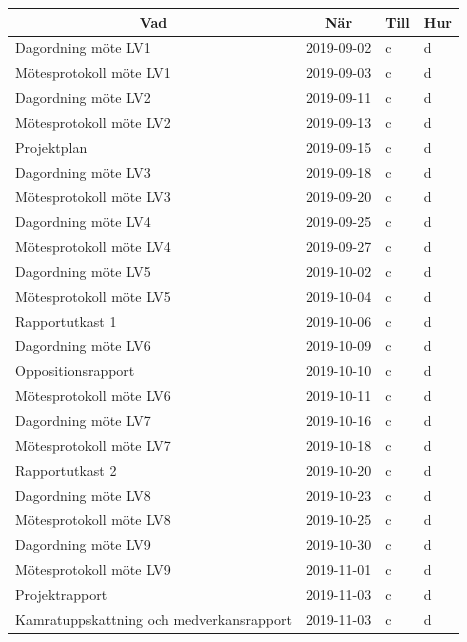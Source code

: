 \documentclass[a4paper]{article}
\begin{document}
\begin{tabular}{|l|l|l|l|}
\hline
\multicolumn{1}{c}{\bfseries Vad} & \multicolumn{1}{c}{\bfseries När} & \multicolumn{1}{c}{\bfseries Till} & \multicolumn{1}{c}{\bfseries Hur} \\ \hline
Dagordning möte LV1 & 2019-09-02 & c & d \\ \hline
Mötesprotokoll möte LV1 & 2019-09-03 & c & d \\ \hline

Dagordning möte LV2 & 2019-09-11 & c & d \\ \hline
Mötesprotokoll möte LV2 & 2019-09-13 & c & d \\ \hline

Projektplan & 2019-09-15 & c & d \\ \hline

Dagordning möte LV3 & 2019-09-18 & c & d \\ \hline
Mötesprotokoll möte LV3 & 2019-09-20 & c & d \\ \hline

Dagordning möte LV4 & 2019-09-25 & c & d \\ \hline
Mötesprotokoll möte LV4 & 2019-09-27 & c & d \\ \hline

Dagordning möte LV5 & 2019-10-02 & c & d \\ \hline
Mötesprotokoll möte LV5 & 2019-10-04 & c & d \\ \hline

Rapportutkast 1 & 2019-10-06 & c & d \\ \hline

Dagordning möte LV6 & 2019-10-09 & c & d \\ \hline
Oppositionsrapport & 2019-10-10 & c & d \\ \hline
Mötesprotokoll möte LV6 & 2019-10-11 & c & d \\ \hline

Dagordning möte LV7 & 2019-10-16 & c & d \\ \hline
Mötesprotokoll möte LV7 & 2019-10-18 & c & d \\ \hline
Rapportutkast 2 & 2019-10-20 & c & d \\ \hline

Dagordning möte LV8 & 2019-10-23 & c & d \\ \hline
Mötesprotokoll möte LV8 & 2019-10-25 & c & d \\ \hline

Dagordning möte LV9 & 2019-10-30 & c & d \\ \hline
Mötesprotokoll möte LV9 & 2019-11-01 & c & d \\ \hline
Projektrapport & 2019-11-03 & c & d \\ \hline
Kamratuppskattning och medverkansrapport & 2019-11-03 & c & d \\ \hline



\end{tabular}
\end{document}
